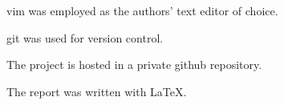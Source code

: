 vim was employed as the authors' text editor of choice.

git was used for version control.

The project is hosted in a private github repository.

The report was written with \LaTeX.
